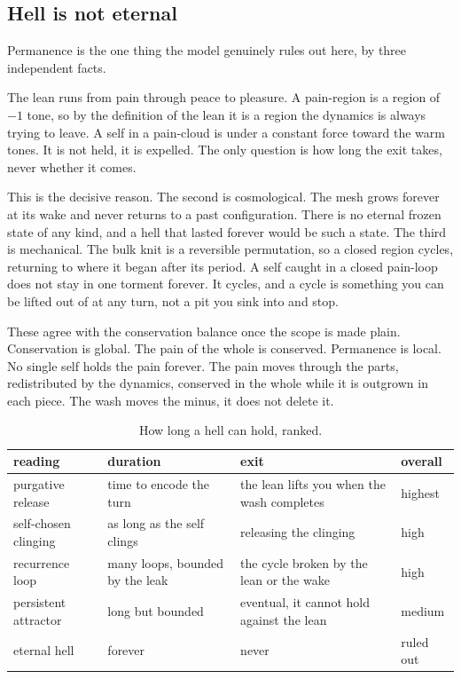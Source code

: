 \subsection{Hell is not eternal}

Permanence is the one thing the model genuinely rules out here, by three independent facts.

\begin{lemma}
The lean runs from pain through peace to pleasure. A pain-region is a region of $-1$ tone, so by the definition of the lean it is a region the dynamics is always trying to leave. A self in a pain-cloud is under a constant force toward the warm tones. It is not held, it is expelled. The only question is how long the exit takes, never whether it comes.
\end{lemma}

This is the decisive reason. The second is cosmological. The mesh grows forever at its wake and never returns to a past configuration. There is no eternal frozen state of any kind, and a hell that lasted forever would be such a state. The third is mechanical. The bulk knit is a reversible permutation, so a closed region cycles, returning to where it began after its period. A self caught in a closed pain-loop does not stay in one torment forever. It cycles, and a cycle is something you can be lifted out of at any turn, not a pit you sink into and stop.

These agree with the conservation balance once the scope is made plain. Conservation is global. The pain of the whole is conserved. Permanence is local. No single self holds the pain forever. The pain moves through the parts, redistributed by the dynamics, conserved in the whole while it is outgrown in each piece. The wash moves the minus, it does not delete it.

\begin{table}[ht]
\centering
\begin{tabular}{@{}llll@{}}
\toprule
reading & duration & exit & overall \\
\midrule
purgative release & time to encode the turn & the lean lifts you when the wash completes & highest \\
self-chosen clinging & as long as the self clings & releasing the clinging & high \\
recurrence loop & many loops, bounded by the leak & the cycle broken by the lean or the wake & high \\
persistent attractor & long but bounded & eventual, it cannot hold against the lean & medium \\
eternal hell & forever & never & ruled out \\
\bottomrule
\end{tabular}
\caption{How long a hell can hold, ranked.}
\label{tab:hell-duration}
\end{table}

